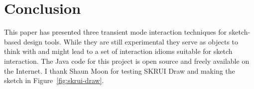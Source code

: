 \documentclass{egpubl}
\begin{document}
\section{Conclusion}

This paper has presented three transient mode interaction techniques
for sketch-based design tools. While they are still experimental they
serve as objects to think with and might lead to a set of interaction
idioms suitable for sketch interaction. The Java code for this project
is open source and freely available on the Internet. I thank Shaun
Moon for testing SKRUI Draw and making the sketch in
Figure~\ref{fig:skrui-draw}.





\end{document}
